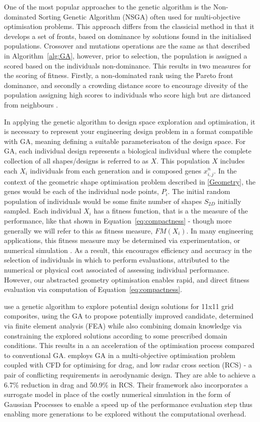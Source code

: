 \documentclass{article}
\begin{document}
One of the most popular approaches to the genetic algorithm is the Non-dominated Sorting Genetic Algorithm (NSGA) often used for multi-objective optimisation problems. This approach differs from the classicial method in that it develops a set of fronts, based on dominance by solutions found in the initialised populations. Crossover and mutations operations are the same as that described in Algorithm~\ref{alg:GA}, however, prior to selection, the population is assigned a scored based on the individuals non-dominance. This results in two measures for the scoring of fitness. Firstly, a non-dominated rank using the Pareto front dominance, and secondly a crowding distance score to encourage divesity of the population assigning high scores to individuals who score high but are distanced from neighbours \citep{SrinivasN1994}.

In applying the genetic algorithm to design space exploration and optimisation, it is necessary to represent your engineering design problem in a format compatible with GA, meaning defining a suitable parameterisaton of the design space. For GA, each individual design represents a biological individual where the complete collection of all shapes/designs is referred to as $X$. This population $X$ includes each $X_i$ individuals from each generation and is composed genes $x^n_{i,j}$. In the context of the geometric shape optimisation problem described in \ref{Geometry}, the genes would be each of the individual node points, $P_i$. The initial random population of individuals would be some finite number of shapes $S_{2D}$ initially sampled. Each individual $X_i$ has a fitness function, that is a the measure of the performance, like that shown in Equation~\eqref{eq:compactness} - though more generally we will refer to this as fitness measure, $FM(X_i)$. In many engineering applications, this fitness measure may be determined via experimentation, or numerical simulation \citep{Pimentel2022}. As a result, this encourages efficiency and accuracy in the selection of individuals in which to perform evaluations, attributed to the numerical or physical cost associated of assessing individual performance. However, our abstracted geometry optimisation enables rapid, and direct fitness evaluation via computation of Equation~\ref{eq:compactness}.

\cite{Kim2021} use a genetic algorithm to explore potential design solutions for 11x11 grid composites, using the GA to propose potentially improved candidate, determined via finite element analysis (FEA) while also combining domain knowledge via constraining the explored solutions according to some prescribed domain conditions. This results in a an acceleration of the optimisation process compared to conventional GA. \cite{Taj2023} employs GA in a multi-objective optimisation problem coupled with CFD for optimising for drag, and low radar cross section (RCS) -  a pair of conflicting requirements in aerodynamic design. They are able to achieve a  6.7\% reduction in drag and 50.9\% in RCS. Their framework also incorporates a surrogate model in place of the costly numerical simulation in the form of Gaussian Processes to enable a speed up of the performance evaluation step thus enabling more generations to be explored without the computational overhead.
\end{document}
